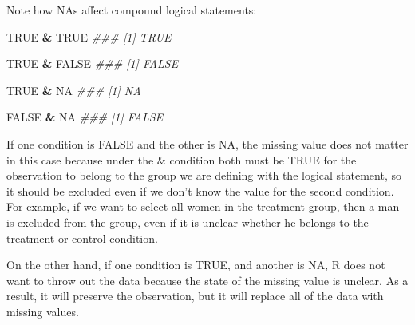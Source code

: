 \documentclass[]{book}
\newenvironment{Shaded}{\begin{snugshade}}{\end{snugshade}}
\newcommand{\CommentTok}[1]{\textcolor[rgb]{0.56,0.35,0.01}{\textit{#1}}}
\newcommand{\OperatorTok}[1]{\textcolor[rgb]{0.81,0.36,0.00}{\textbf{#1}}}
\newcommand{\OtherTok}[1]{\textcolor[rgb]{0.56,0.35,0.01}{#1}}
\newcommand{\StringTok}[1]{\textcolor[rgb]{0.31,0.60,0.02}{#1}}
\theoremstyle{definition}
\theoremstyle{definition}
\theoremstyle{definition}
\theoremstyle{remark}
\begin{document}
Note how NAs affect compound logical statements:

\begin{Shaded}
\begin{Highlighting}[]
\OtherTok{TRUE} \OperatorTok{&}\StringTok{ }\OtherTok{TRUE}
\CommentTok{### [1] TRUE}

\OtherTok{TRUE} \OperatorTok{&}\StringTok{ }\OtherTok{FALSE}
\CommentTok{### [1] FALSE}

\OtherTok{TRUE} \OperatorTok{&}\StringTok{ }\OtherTok{NA}
\CommentTok{### [1] NA}

\OtherTok{FALSE} \OperatorTok{&}\StringTok{ }\OtherTok{NA}
\CommentTok{### [1] FALSE}
\end{Highlighting}
\end{Shaded}

If one condition is FALSE and the other is NA, the missing value does
not matter in this case because under the \& condition both must be TRUE
for the observation to belong to the group we are defining with the
logical statement, so it should be excluded even if we don't know the
value for the second condition. For example, if we want to select all
women in the treatment group, then a man is excluded from the group,
even if it is unclear whether he belongs to the treatment or control
condition.

On the other hand, if one condition is TRUE, and another is NA, R does
not want to throw out the data because the state of the missing value is
unclear. As a result, it will preserve the observation, but it will
replace all of the data with missing values.
\end{document}
